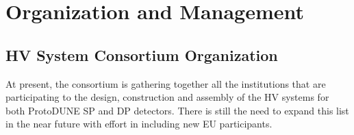 \section{Organization and Management}
\label{sec:fddp-hv-org}


\subsection{HV System Consortium Organization}
\label{sec:fddp-hv-org-consortium}

At present, the consortium is gathering together all the institutions that are participating to the design, construction and assembly of the HV systems for both ProtoDUNE SP and DP detectors. There is still the need to expand this list in the near future with effort in including new EU participants.

